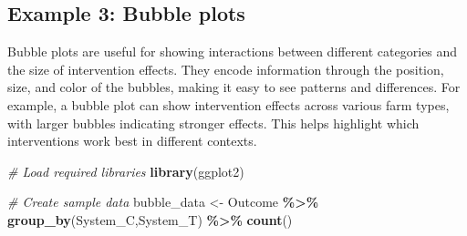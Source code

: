 \documentclass[
]{book}
\newenvironment{Shaded}{\begin{snugshade}}{\end{snugshade}}
\newcommand{\CommentTok}[1]{\textcolor[rgb]{0.56,0.35,0.01}{\textit{#1}}}
\newcommand{\FunctionTok}[1]{\textcolor[rgb]{0.13,0.29,0.53}{\textbf{#1}}}
\newcommand{\NormalTok}[1]{#1}
\newcommand{\OtherTok}[1]{\textcolor[rgb]{0.56,0.35,0.01}{#1}}
\newcommand{\SpecialCharTok}[1]{\textcolor[rgb]{0.81,0.36,0.00}{\textbf{#1}}}
\begin{document}
\subsection{Example 3: Bubble plots}\label{example-3-bubble-plots}

Bubble plots are useful for showing interactions between different categories and the size of intervention effects.
They encode information through the position, size, and color of the bubbles, making it easy to see patterns and differences.
For example, a bubble plot can show intervention effects across various farm types, with larger bubbles indicating stronger effects.
This helps highlight which interventions work best in different contexts.

\begin{Shaded}
\begin{Highlighting}[]
\CommentTok{\# Load required libraries}
\FunctionTok{library}\NormalTok{(ggplot2)}

\CommentTok{\# Create sample data}
\NormalTok{bubble\_data }\OtherTok{\textless{}{-}}\NormalTok{ Outcome }\SpecialCharTok{\%\textgreater{}\%} 
  \FunctionTok{group\_by}\NormalTok{(System\_C,System\_T) }\SpecialCharTok{\%\textgreater{}\%} 
  \FunctionTok{count}\NormalTok{()}


\end{Highlighting}
\end{Shaded}
\end{document}
